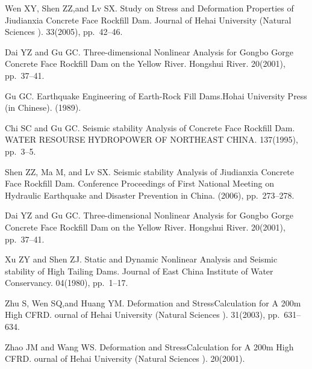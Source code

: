 
\begin{thebibliography}{09}

{\sc Wen XY, Shen ZZ,and Lv SX}. {Study on Stress and Deformation Properties of Jiudianxia Concrete Face Rockfill Dam}. Journal of Hehai University (Natural Sciences ). 33(2005), pp.~42--46.

{\sc Dai YZ and Gu GC}. {Three-dimensional Nonlinear Analysis for Gongbo Gorge Concrete Face Rockfill Dam on the Yellow River}. Hongshui River. 20(2001), pp.~37--41.

{\sc Gu GC}. {Earthquake Engineering of Earth-Rock Fill Dams}.Hohai University Press (in Chinese). (1989).

{\sc Chi SC and Gu GC}. {Seismic stability Analysis of Concrete Face Rockfill Dam}. WATER RESOURSE HYDROPOWER OF NORTHEAST CHINA. 137(1995), pp.~3--5.

{\sc Shen ZZ, Ma M, and Lv SX}. {Seismic stability Analysis of Jiudianxia Concrete Face Rockfill Dam}. Conference Proceedings of First National Meeting on Hydraulic Earthquake and Disaster Prevention in China. (2006), pp.~273--278.

{\sc Dai YZ and  Gu GC}. {Three-dimensional Nonlinear Analysis for Gongbo Gorge Concrete Face Rockfill Dam on the Yellow River}. Hongshui River. 20(2001), pp.~37--41.

{\sc Xu ZY and Shen ZJ}. {Static and Dynamic Nonlinear Analysis and Seismic stability of High Tailing Dams}. Journal of East China Institute of Water Conservancy. 04(1980), pp.~1--17.

{\sc Zhu S, Wen SQ,and Huang YM}. {Deformation and StressCalculation for A 200m High CFRD}. ournal of Hehai University (Natural Sciences ). 31(2003), pp.~631--634.

{\sc Zhao JM and Wang WS}. {Deformation and StressCalculation for A 200m High CFRD}. ournal of Hehai University (Natural Sciences ). 20(2001).

\end{thebibliography}